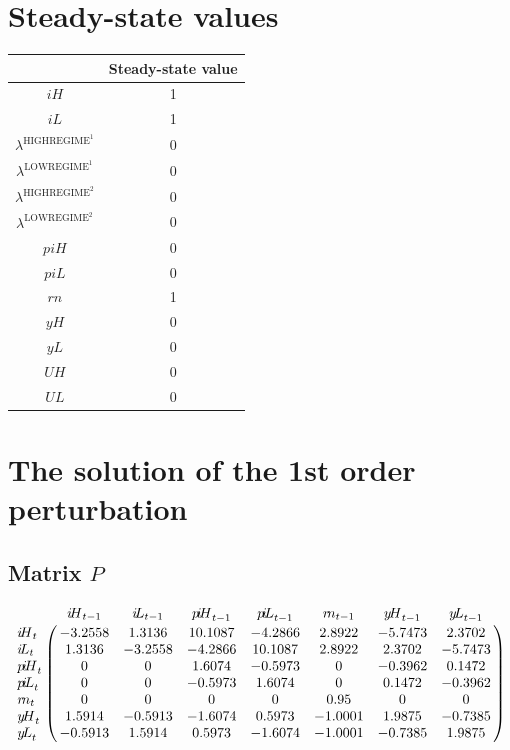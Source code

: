 

\section{Steady-state values}


\begin{tabular}{c|c|}
  & Steady-state value\\
\hline
${i\!H}$ & 1 \\
${i\!L}$ & 1 \\
$\lambda^{\mathrm{HIGHREGIME}^{\mathrm{1}}}$ & 0 \\
$\lambda^{\mathrm{LOWREGIME}^{\mathrm{1}}}$ & 0 \\
$\lambda^{\mathrm{HIGHREGIME}^{\mathrm{2}}}$ & 0 \\
$\lambda^{\mathrm{LOWREGIME}^{\mathrm{2}}}$ & 0 \\
${p\!i\!H}$ & 0 \\
${p\!i\!L}$ & 0 \\
${r\!n}$ & 1 \\
${y\!H}$ & 0 \\
${y\!L}$ & 0 \\
${U\!H}$ & 0 \\
${U\!L}$ & 0 \\
\hline
\end{tabular}


\section{The solution of the 1st order perturbation}

\subsection*{Matrix $P$}

$$\bordermatrix{
~ & {i\!H}_{t-1} & {i\!L}_{t-1} & {p\!i\!H}_{t-1} & {p\!i\!L}_{t-1} & {r\!n}_{t-1} & {y\!H}_{t-1} & {y\!L}_{t-1} \cr
{i\!H}_{t} & -3.2558 & 1.3136 & 10.1087 & -4.2866 & 2.8922 & -5.7473 & 2.3702 \cr
{i\!L}_{t} & 1.3136 & -3.2558 & -4.2866 & 10.1087 & 2.8922 & 2.3702 & -5.7473 \cr
{p\!i\!H}_{t} & 0 & 0 & 1.6074 & -0.5973 & 0 & -0.3962 & 0.1472 \cr
{p\!i\!L}_{t} & 0 & 0 & -0.5973 & 1.6074 & 0 & 0.1472 & -0.3962 \cr
{r\!n}_{t} & 0 & 0 & 0 & 0 & 0.95 & 0 & 0 \cr
{y\!H}_{t} & 1.5914 & -0.5913 & -1.6074 & 0.5973 & -1.0001 & 1.9875 & -0.7385 \cr
{y\!L}_{t} & -0.5913 & 1.5914 & 0.5973 & -1.6074 & -1.0001 & -0.7385 & 1.9875 \cr
}$$

